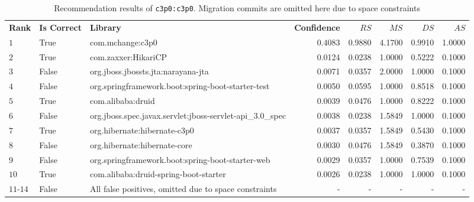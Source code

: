 \documentclass[conference, 10pt]{IEEEtran}
\begin{document}
\begin{table}[]
\caption{Recommendation results of \texttt{c3p0:c3p0}. Migration commits are omitted here due to space constraints}
\centering
\begin{tabular}{|l|l|l|r|r|r|r|r|}
\hline
 \textbf{Rank} & \textbf{Is Correct} & \textbf{Library} & \textbf{Confidence} & $RS$ & $MS$ & $DS$ & $AS$  \\
 \hhline{|=|=|=|=|=|=|=|=|}
 $1$  & True  & com.mchange:c3p0                                          & 0.4083 & 0.9880 & 4.1700 & 0.9910 & 1.0000 \\ \hline
 $2$  & True  & com.zaxxer:HikariCP                                       & 0.0124 & 0.0238 & 1.0000 & 0.5222 & 0.1000 \\ \hline
 $3$  & False & org.jboss.jbossts.jta:narayana-jta                        & 0.0071 & 0.0357 & 2.0000 & 1.0000 & 0.1000 \\ \hline
 $4$  & False & org.springframework.boot:spring-boot-starter-test         & 0.0050 & 0.0595 & 1.0000 & 0.8518 & 0.1000 \\ \hline
 $5$  & True  & com.alibaba:druid                                         & 0.0039 & 0.0476 & 1.0000 & 0.8222 & 0.1000 \\ \hline
 $6$  & False & org.jboss.spec.javax.servlet:jboss-servlet-api\_3.0\_spec & 0.0038 & 0.0238 & 1.5849 & 1.0000 & 0.1000 \\ \hline
 $7$  & True  & org.hibernate:hibernate-c3p0                              & 0.0037 & 0.0357 & 1.5849 & 0.5430 & 0.1000 \\ \hline
 $8$  & False & org.hibernate:hibernate-core                              & 0.0030 & 0.0476 & 1.5849 & 0.3870 & 0.1000 \\ \hline
 $9$  & False & org.springframework.boot:spring-boot-starter-web          & 0.0029 & 0.0357 & 1.0000 & 0.7539 & 0.1000 \\ \hline
 $10$ & True  & com.alibaba:druid-spring-boot-starter                     & 0.0026 & 0.0238 & 1.0000 & 1.0000 & 0.1000 \\ \hline
 $11$-$14$ & False & All false positives, omitted due to space constraints  & - & - & - & - & - \\ \hline

\end{tabular}
\end{table}
\end{document}
